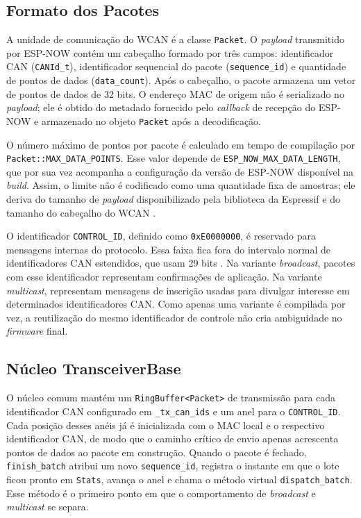 \subsection{Formato dos Pacotes}

A unidade de comunicação do WCAN é a classe \texttt{Packet}. O \emph{payload} transmitido
por ESP-NOW contém um cabeçalho formado por três campos: identificador CAN
(\texttt{CANId\_t}), identificador sequencial do pacote
(\texttt{sequence\_id}) e quantidade de pontos de dados
(\texttt{data\_count}). Após o cabeçalho, o pacote armazena um vetor de pontos de
dados de 32 bits. O endereço MAC de origem não é serializado no \emph{payload}; ele é
obtido do metadado fornecido pelo \emph{callback} de recepção do ESP-NOW e armazenado no
objeto \texttt{Packet} após a decodificação.

O número máximo de pontos por pacote é calculado em tempo de compilação por
\texttt{Packet::MAX\_DATA\_POINTS}. Esse valor depende de
\texttt{ESP\_NOW\_MAX\_DATA\_LENGTH}, que por sua vez acompanha a configuração da
versão de ESP-NOW disponível na \emph{build}. Assim, o limite não é codificado como uma
quantidade fixa de amostras; ele deriva do tamanho de \emph{payload} disponibilizado pela
biblioteca da Espressif e do tamanho do cabeçalho do WCAN
\cite{espressif_espnow_programming_guide}.

O identificador \texttt{CONTROL\_ID}, definido como \texttt{0xE0000000}, é
reservado para mensagens internas do protocolo. Essa faixa fica fora do intervalo
normal de identificadores CAN estendidos, que usam 29 bits
\cite{iso11898_1_2024}. Na variante \emph{broadcast}, pacotes com esse identificador
representam confirmações de aplicação. Na variante \emph{multicast}, representam
mensagens de inscrição usadas para divulgar interesse em determinados
identificadores CAN. Como apenas uma variante é compilada por vez, a reutilização
do mesmo identificador de controle não cria ambiguidade no \emph{firmware} final.

\subsection{Núcleo TransceiverBase}

O núcleo comum mantém um \texttt{RingBuffer<Packet>} de transmissão para cada identificador CAN configurado em \texttt{\_tx\_can\_ids} e um anel para o \texttt{CONTROL\_ID}. Cada posição desses anéis já é inicializada com o MAC local e o
respectivo identificador CAN, de modo que o caminho crítico de envio apenas acrescenta
pontos de dados ao pacote em construção. Quando o
pacote é fechado, \texttt{finish\_batch} atribui um novo
\texttt{sequence\_id}, registra o instante em que o lote ficou pronto em
\texttt{Stats}, avança o anel e chama o método virtual
\texttt{dispatch\_batch}. Esse método é o primeiro ponto em que o comportamento
de \emph{broadcast} e \emph{multicast} se separa.

